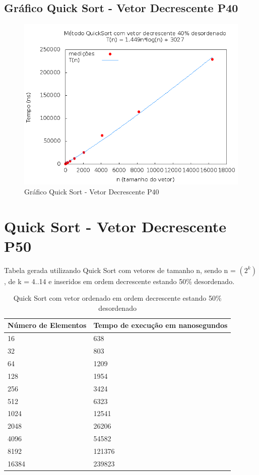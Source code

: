 \documentclass[12pt,a4paper,twoside]{report}
\begin{document}
\subsection{Gráfico Quick Sort - Vetor Decrescente P40}
\begin{figure}[H]
    \centering
    \includegraphics[width=0.7\linewidth]{graficos/QuickSort/vIntDecrescenteP40/vIntDecrescenteP40.png}
  \caption{Gráfico Quick Sort - Vetor Decrescente P40}
\end{figure}

\section{Quick Sort - Vetor Decrescente P50}
Tabela gerada utilizando Quick Sort com vetores de tamanho n, sendo n = $(2^k)$, de k = 4..14 e inseridos em ordem decrescente estando 50\% desordenado.
\begin{table}[H]
\centering
\caption{Quick Sort com vetor ordenado em ordem decrescente estando 50\% desordenado}
\label{my-label}
\begin{tabular}{|l|l|}
\hline
\multicolumn{1}{|c|}{\textbf{Número de Elementos}} & \multicolumn{1}{c|}{\textbf{Tempo de execução em nanosegundos}} \\ \hline
16 & 638 \\ \hline
32 & 803 \\ \hline
64 & 1209 \\ \hline
128 & 1954 \\ \hline
256 & 3424 \\ \hline
512 & 6323 \\ \hline
1024 & 12541 \\ \hline
2048 & 26206 \\ \hline
4096 & 54582 \\ \hline
8192 & 121376 \\ \hline
16384 & 239823 \\ \hline
\end{tabular}
\end{table}
\end{document}
